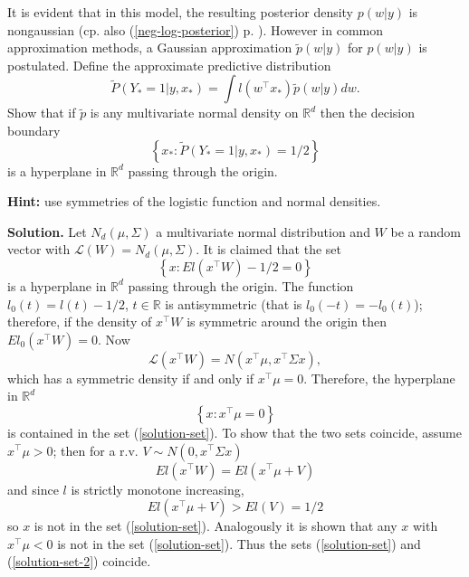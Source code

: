 \documentclass[11pt,twoside]{article}%
\theoremstyle{change}
\newenvironment{quote-env}{\begin{quote}\sffamily }{\end{quote}}
\newenvironment{mycomments-env}[1][Mycomments]{\textbf{#1.} \begin{quote-env} }{ \end{quote-env}  \ \rule{0.5em}{0.5em}}
\begin{document}
It is evident that in this model, the resulting posterior density $p\left(
w|y\right)  $ is nongaussian (cp. also (\ref{neg-log-posterior}) p.
\pageref{neg-log-posterior}). However in common approximation methods, a
Gaussian approximation $\tilde{p}\left(  w|y\right)  $ for $p\left(
w|y\right)  $ is postulated. Define the approximate predictive distribution%
\[
\tilde{P}\left(  Y_{\ast}=1|y,x_{\ast}\right)  =\int l\left(  w^{\top}x_{\ast
}\right)  \tilde{p}\left(  w|y\right)  dw.
\]
Show that if $\tilde{p}$ is any multivariate normal density on $\mathbb{R}%
^{d}$ then the decision boundary
\[
\left\{  x_{\ast}:\tilde{P}\left(  Y_{\ast}=1|y,x_{\ast}\right)  =1/2\right\}
\]
is a hyperplane in $\mathbb{R}^{d}$ passing through the origin.

\textbf{Hint:} use symmetries of the logistic function and normal densities.%

\begin{mycomments}%


\begin{mycomments-env}
\textbf{Solution.} Let $N_{d}(\mu,\Sigma)$ a multivariate normal distribution
and $W$ be a random vector with $\mathcal{L}(W)=N_{d}(\mu,\Sigma)$. It is
claimed that the set
\begin{equation}
\left\{  x:El\left(  x^{\top}W\right)  -1/2=0\right\} \label{solution-set}%
\end{equation}
is a hyperplane in $\mathbb{R}^{d}$ passing through the origin. The function
$l_{0}(t)=l(t)-1/2$, $t\in\mathbb{R}$ is antisymmetric (that is $l_{0}%
(-t)=-l_{0}(t)$); therefore, if the density of $x^{\top}W$ is symmetric around
the origin then $El_{0}\left(  x^{\top}W\right)  =0$. Now
\[
\mathcal{L}\left(  x^{\top}W\right)  =N\left(  x^{\top}\mu,x^{\top}\Sigma
x\right)  ,
\]
which has a symmetric density if and only if $x^{\top}\mu=0$. Therefore, the
hyperplane in $\mathbb{R}^{d}$%
\begin{equation}
\left\{  x:x^{\top}\mu=0\right\} \label{solution-set-2}%
\end{equation}
is contained in the set (\ref{solution-set}). To show that the two sets
coincide, assume $x^{\top}\mu>0$; then for a r.v. $V\sim N(0,x^{\top}\Sigma
x)$
\[
El\left(  x^{\top}W\right)  =El\left(  x^{\top}\mu+V\right)
\]
and since $l$ is strictly monotone increasing,
\[
El\left(  x^{\top}\mu+V\right)  >El\left(  V\right)  =1/2
\]
so $x$ is not in the set (\ref{solution-set}). Analogously it is shown that
any $x$ with $x^{\top}\mu<0$ is not in the set (\ref{solution-set}). Thus the
sets (\ref{solution-set}) and (\ref{solution-set-2}) coincide.
\end{mycomments-env}%

\end{mycomments}%
\end{document}
